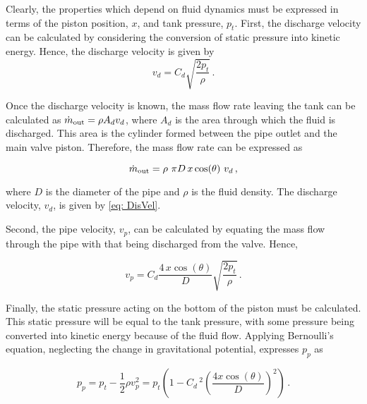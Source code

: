 Clearly, the properties which depend on fluid dynamics must be expressed in terms of the piston position, $x$, and tank pressure, $p_t$. First, the discharge velocity can be calculated by considering the conversion of static pressure into kinetic energy. Hence, the discharge velocity is given by
~
\begin{equation} \label{eq: DisVel}
    v_d = C_d \sqrt{\frac{2 p_t}{\rho}} \, .
\end{equation}

Once the discharge velocity is known, the mass flow rate leaving the tank can be calculated as $\dot{m}_{\rm{out}} = \rho A_d v_d$, where $A_d$ is the area through which the fluid is discharged. This area is the cylinder formed between the pipe outlet and the main valve piston. Therefore, the mass flow rate can be expressed as

\begin{equation} \label{eq: ValveMassDischarge}
    \dot{m}_{\rm{out}} =
    \rho \,\, \pi D \, x \cos(\theta) \,\, v_d \, ,
\end{equation}

where $D$ is the diameter of the pipe and $\rho$ is the fluid density. The discharge velocity, $v_d$, is given by \cref{eq: DisVel}.

Second, the pipe velocity, $v_p$, can be calculated by equating the mass flow through the pipe with that being discharged from the valve. Hence,

\begin{equation*}
    v_p = C_d \frac{4 \, x \cos(\theta)}{D} \sqrt{\frac{2 p_t}{\rho}} \, .
\end{equation*}

Finally, the static pressure acting on the bottom of the piston must be calculated. This static pressure will be equal to the tank pressure, with some pressure being converted into kinetic energy because of the fluid flow. Applying Bernoulli's equation, neglecting the change in gravitational potential, expresses $p_p$ as

\begin{equation*}
    p_p = p_t - \frac{1}{2} \rho v_p ^2 =
    p_t \left( 1 - C_d \,^2 \left( \frac{4 x \cos(\theta)}{D} \right)^2 \right) \, .
\end{equation*}

